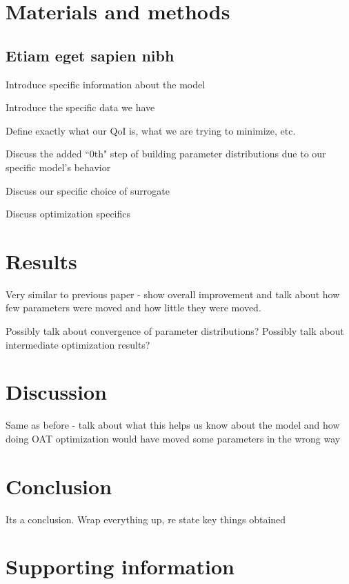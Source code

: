 \documentclass[10pt,letterpaper]{article}
\begin{document}
	\section*{Materials and methods}
	\subsection*{Etiam eget sapien nibh}
	
	Introduce specific information about the model
	
	Introduce the specific data we have
	
	Define exactly what our QoI is, what we are trying to minimize, etc. 
	
	Discuss the added ``0th" step of building parameter distributions due to our specific model's behavior
	
	Discuss our specific choice of surrogate
	
	Discuss optimization specifics 
	
	
	
	
	\section*{Results}
	
	
	Very similar to previous paper - show overall improvement and talk about how few parameters were moved and how little they were moved.
	
	Possibly talk about convergence of parameter distributions? Possibly talk about intermediate optimization results?
	
	
	\section*{Discussion}
	
	Same as before - talk about what this helps us know about the model and how doing OAT optimization would have moved some parameters in the wrong way
	
	
	\section*{Conclusion}
	
	Its a conclusion. Wrap everything up, re state key things obtained
	
	
	\section*{Supporting information}
	
\end{document}
